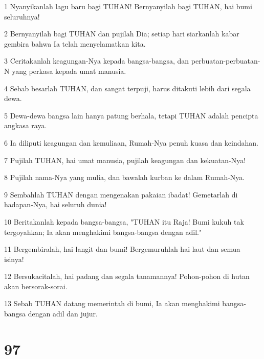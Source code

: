 \par 1 Nyanyikanlah lagu baru bagi TUHAN! Bernyanyilah bagi TUHAN, hai bumi seluruhnya!
\par 2 Bernyanyilah bagi TUHAN dan pujilah Dia; setiap hari siarkanlah kabar gembira bahwa Ia telah menyelamatkan kita.
\par 3 Ceritakanlah keagungan-Nya kepada bangsa-bangsa, dan perbuatan-perbuatan-N yang perkasa kepada umat manusia.
\par 4 Sebab besarlah TUHAN, dan sangat terpuji, harus ditakuti lebih dari segala dewa.
\par 5 Dewa-dewa bangsa lain hanya patung berhala, tetapi TUHAN adalah pencipta angkasa raya.
\par 6 Ia diliputi keagungan dan kemuliaan, Rumah-Nya penuh kuasa dan keindahan.
\par 7 Pujilah TUHAN, hai umat manusia, pujilah keagungan dan kekuatan-Nya!
\par 8 Pujilah nama-Nya yang mulia, dan bawalah kurban ke dalam Rumah-Nya.
\par 9 Sembahlah TUHAN dengan mengenakan pakaian ibadat! Gemetarlah di hadapan-Nya, hai seluruh dunia!
\par 10 Beritakanlah kepada bangsa-bangsa, "TUHAN itu Raja! Bumi kukuh tak tergoyahkan; Ia akan menghakimi bangsa-bangsa dengan adil."
\par 11 Bergembiralah, hai langit dan bumi! Bergemuruhlah hai laut dan semua isinya!
\par 12 Bersukacitalah, hai padang dan segala tanamannya! Pohon-pohon di hutan akan bersorak-sorai.
\par 13 Sebab TUHAN datang memerintah di bumi, Ia akan menghakimi bangsa-bangsa dengan adil dan jujur.

\chapter{97}

